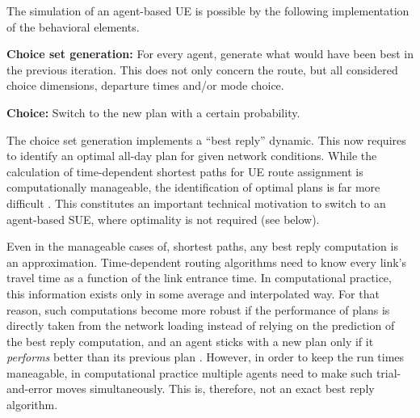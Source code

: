 The simulation of an agent-based UE is possible by the following 
implementation of the behavioral elements.

%
%
%
%

\textbf{Choice set generation:} For every agent,
  generate what would have been best in the previous iteration.
  This does not only concern the route,
  but all considered choice dimensions, \eg departure times and/or
  mode choice. 

\textbf{Choice:} Switch to the new plan with a
  certain probability.

The choice set generation implements a ``best reply'' dynamic.
This now requires to identify an optimal all-day plan for given network conditions. 
While the calculation of time-dependent shortest paths for UE route assignment is 
computationally manageable, the identification of optimal plans is far more difficult 
\citep[][]{recker-2001}. 
This constitutes an important technical motivation to switch to an agent-based SUE, 
where optimality is not required (see below).

Even in the manageable cases of, \eg shortest paths, 
any best reply computation is an approximation.  
Time-dependent routing algorithms need to know every link's travel
time as a function of the link entrance time.  In computational
practice, this information exists only in some average and
interpolated way.  For that reason, such computations become more
robust if the performance of plans is directly taken from the network
loading instead of relying on the prediction of the best reply
computation, and an agent sticks with a new plan only if it
\emph{performs} better than its previous plan
\citep{RaneyNagel2004agdb}.  However, in order to keep the run times
maneagable, in computational practice multiple agents need to make
such trial-and-error moves simultaneously.  This is, therefore, not an
exact best reply algorithm.

